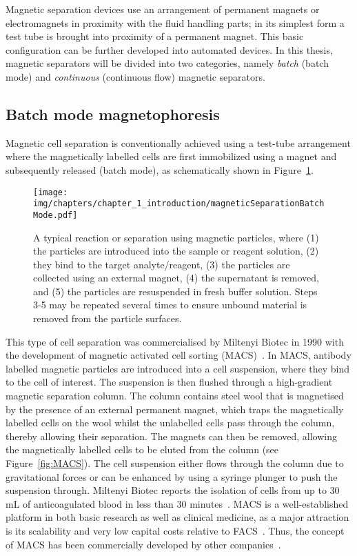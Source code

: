 Magnetic separation devices use an arrangement of permanent magnets or electromagnets in proximity with the fluid handling parts; in its simplest form a test tube is brought into proximity of a permanent magnet. This basic configuration can be further developed into automated devices. In this thesis, magnetic separators will be divided into two categories, namely \textit{batch} (batch mode) and \textit{continuous} (continuous flow) magnetic separators.

\subsection{Batch mode magnetophoresis}
Magnetic cell separation is conventionally achieved using a test-tube arrangement where the magnetically labelled cells are first immobilized using a magnet and subsequently released (batch mode), as schematically shown in Figure~\ref{fig:magneticSeparationBatchMode}.

\begin{figure}[htb]
\centering
\texttt{[image: img/chapters/chapter\_1\_introduction/magneticSeparationBatchMode.pdf]}
\caption[Batch mode magnetic particle separation]{A typical reaction or separation using magnetic particles, where (1) the particles are introduced into the sample or reagent solution, (2) they bind to the target analyte/reagent, (3) the particles are collected using an external magnet, (4) the supernatant is removed, and (5) the particles are resuspended in fresh buffer solution. Steps 3-5 may be repeated several times to ensure unbound material is removed from the particle surfaces.}
\label{fig:magneticSeparationBatchMode}
\end{figure}

This type of cell separation was commercialised by Miltenyi Biotec in 1990 with the development of magnetic activated cell sorting (MACS)~\cite{Miltenyi1990}. In MACS, antibody labelled magnetic particles are introduced into a cell suspension, where they bind to the cell of interest. The suspension is then flushed through a high-gradient magnetic separation column. The column contains steel wool that is magnetised by the presence of an external permanent magnet, which traps the magnetically labelled cells on the wool whilst the unlabelled cells pass through the column, thereby allowing their separation. The magnets can then be removed, allowing the magnetically labelled cells to be eluted from the column (see Figure~\ref{fig:MACS}). The cell suspension either flows through the column due to gravitational forces or can be enhanced by using a syringe plunger to push the suspension through. Miltenyi Biotec reports the isolation of cells from up to $30$ mL of anticoagulated blood in less than $30$ minutes~\cite{MiltenyiBiotec2017}. MACS is a well-established platform in both basic research as well as clinical medicine, as a major attraction is its scalability and very low capital costs relative to FACS~\cite{Thiel1998}. Thus, the concept of MACS has been commercially developed by other companies~\cite{Thanh2012}. 

